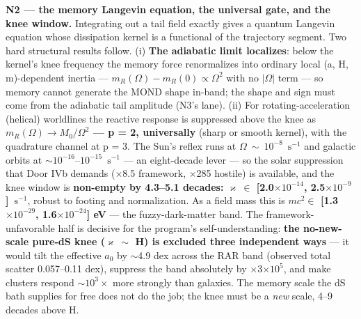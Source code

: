 \documentclass[11pt,a4paper]{article}
\begin{document}
\textbf{N2 --- the memory Langevin equation, the universal gate, and the knee window.} Integrating out a tail field exactly gives a quantum Langevin equation whose dissipation kernel is a functional of the trajectory segment. Two hard structural results follow. (i) \textbf{The adiabatic limit localizes}: below the kernel's knee frequency the memory force renormalizes into ordinary local (a, H, m)-dependent inertia --- $m_R(\Omega) - m_R(0) \propto \Omega^2$ with no $|\Omega|$ term --- so memory cannot generate the MOND shape in-band; the shape and sign must come from the adiabatic tail amplitude (N3's lane). (ii) For rotating-acceleration (helical) worldlines the reactive response is suppressed above the knee as \textbf{$m_R(\Omega) \to M_0/\Omega^2$ --- p = 2, universally} (sharp or smooth kernel), with the quadrature channel at p = 3. The Sun's reflex runs at $\Omega\ \sim\ 10^{-8}$\ $\mathrm{s^{-1}}$ and galactic orbits at $\sim{}10^{-16}$--$10^{-15}$\ $\mathrm{s^{-1}}$ --- an eight-decade lever --- so the solar suppression that Door IVb demands ($\times$8.5 framework, $\times$285 hostile) is available, and the knee window is \textbf{non-empty by 4.3--5.1 decades: $\varkappa\ \in$ [2.0$\times10^{-14}$, 2.5$\times10^{-9}$]\ $\mathrm{s^{-1}}$}, robust to footing and normalization. As a field mass this is \textbf{$mc^2 \in$ [1.3$\times10^{-29}$, 1.6$\times10^{-24}$] eV} --- the fuzzy-dark-matter band. The framework-unfavorable half is decisive for the program's self-understanding: \textbf{the no-new-scale pure-dS knee ($\varkappa\ \sim$ H) is excluded three independent ways} --- it would tilt the effective $a_{0}$ by $\sim$4.9 dex across the RAR band (observed total scatter 0.057--0.11 dex), suppress the band absolutely by $\times$3$\times10^{5}$, and make clusters respond $\sim{}10^{3}{}\times$ more strongly than galaxies. The memory scale the dS bath supplies for free does not do the job; the knee must be a \emph{new} scale, 4--9 decades above H.
\end{document}
